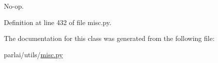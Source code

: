 \begin{DoxyVerb}No-op.\end{DoxyVerb}
 

Definition at line 432 of file misc.\+py.



The documentation for this class was generated from the following file\+:\begin{DoxyCompactItemize}
\item 
parlai/utils/\hyperlink{misc_8py}{misc.\+py}\end{DoxyCompactItemize}
